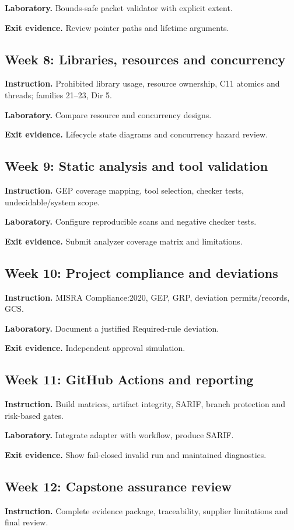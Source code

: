 \documentclass[10pt,letterpaper]{article}
\begin{document}
\textbf{Laboratory.} Bounds-safe packet validator with explicit extent.

\textbf{Exit evidence.} Review pointer paths and lifetime arguments.

\subsection{Week 8: Libraries, resources and concurrency}
\textbf{Instruction.} Prohibited library usage, resource ownership, C11 atomics and threads; families 21--23, Dir 5.

\textbf{Laboratory.} Compare resource and concurrency designs.

\textbf{Exit evidence.} Lifecycle state diagrams and concurrency hazard review.

\subsection{Week 9: Static analysis and tool validation}
\textbf{Instruction.} GEP coverage mapping, tool selection, checker tests, undecidable/system scope.

\textbf{Laboratory.} Configure reproducible scans and negative checker tests.

\textbf{Exit evidence.} Submit analyzer coverage matrix and limitations.

\subsection{Week 10: Project compliance and deviations}
\textbf{Instruction.} MISRA Compliance:2020, GEP, GRP, deviation permits/records, GCS.

\textbf{Laboratory.} Document a justified Required-rule deviation.

\textbf{Exit evidence.} Independent approval simulation.

\subsection{Week 11: GitHub Actions and reporting}
\textbf{Instruction.} Build matrices, artifact integrity, SARIF, branch protection and risk-based gates.

\textbf{Laboratory.} Integrate adapter with workflow, produce SARIF.

\textbf{Exit evidence.} Show fail-closed invalid run and maintained diagnostics.

\subsection{Week 12: Capstone assurance review}
\textbf{Instruction.} Complete evidence package, traceability, supplier limitations and final review.
\end{document}
